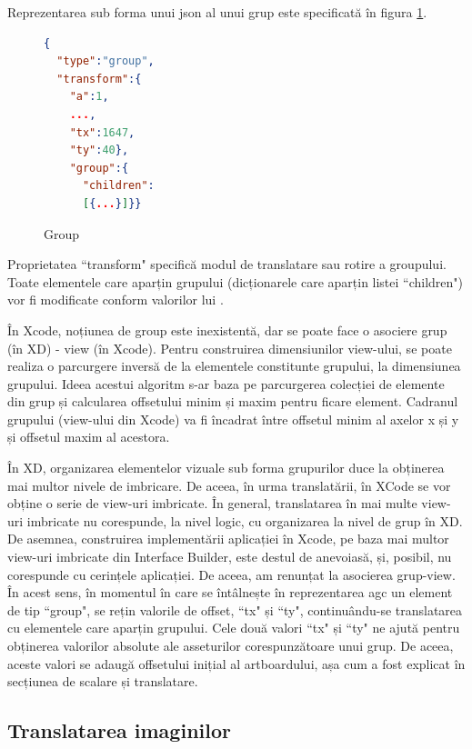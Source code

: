Reprezentarea sub forma unui json al unui grup este specificată în figura \ref{fig:Group}. 

\begin{figure}[!htbp]
\begin{lstlisting}[language=json,firstnumber=1]
{
  "type":"group",
  "transform":{
    "a":1,
    ...,
    "tx":1647,
    "ty":40},
    "group":{
      "children":
      [{...}]}}
\end{lstlisting}
\caption{Group} \label{fig:Group}
\end{figure}

Proprietatea ``transform" specifică modul de translatare sau rotire a groupului. Toate elementele care aparțin grupului (dicționarele care aparțin listei ``children") vor fi modificate conform valorilor lui .

În Xcode, noțiunea de group este inexistentă, dar se poate face o asociere grup (în XD) - view (în Xcode).  
Pentru construirea dimensiunilor view-ului, se poate realiza o parcurgere inversă de la elementele constitunte grupului, la dimensiunea grupului. Ideea acestui algoritm s-ar baza pe parcurgerea colecției de elemente din grup și calcularea offsetului minim și maxim pentru ficare element. Cadranul grupului (view-ului din Xcode) va fi încadrat între offsetul minim al axelor x și y și offsetul maxim al acestora.

În XD, organizarea elementelor vizuale sub forma grupurilor duce la obținerea mai multor nivele de imbricare. De aceea, în urma translatării, în XCode se vor obține o serie de view-uri imbricate. În general, translatarea în mai multe view-uri imbricate nu corespunde, la nivel logic, cu organizarea la nivel de grup în XD. De asemnea, construirea implementării aplicației în Xcode, pe baza mai multor view-uri imbricate din Interface Builder, este destul de anevoiasă, și, posibil, nu corespunde cu cerințele aplicației. De aceea, am renunțat la asocierea grup-view. În acest sens, în momentul în care se întâlnește în reprezentarea agc un element de tip ``group", se rețin valorile de offset, ``tx" și ``ty", continuându-se translatarea cu elementele care aparțin grupului.  Cele două valori ``tx" și ``ty" ne ajută pentru obținerea valorilor absolute ale asseturilor corespunzătoare unui grup. De aceea, aceste valori se adaugă offsetului inițial al artboardului, așa cum a fost explicat în secțiunea de scalare și translatare.

\subsection{Translatarea imaginilor}

